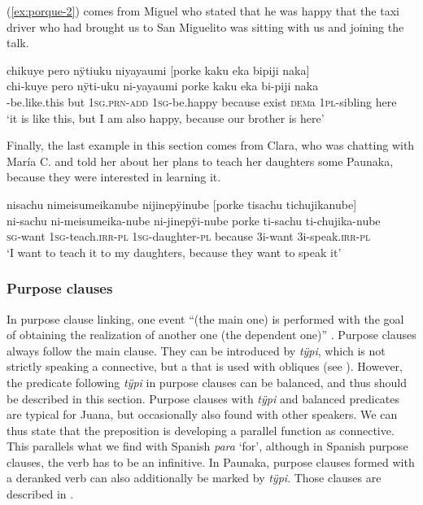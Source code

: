 (\ref{ex:porque-2}) comes from Miguel who stated that he was happy that the taxi driver who had brought us to San Miguelito was sitting with us and joining the talk.

\ea\label{ex:porque-2}
\begingl
\glpreamble chikuye pero nÿtiuku niyayaumi \textup{[}porke kaku eka bipiji naka\textup{]}\\
\gla chi-kuye pero nÿti-uku ni-yayaumi porke kaku eka bi-piji naka\\
-be.like.this but 1\textsc{sg.prn}-\textsc{add} 1\textsc{sg}-be.happy because exist \textsc{dem}a 1\textsc{pl}-sibling here\\
\glft ‘it is like this, but I am also happy, because our brother is here’
\endgl
\trailingcitation{[mty-p110906l.208-209]}
\xe


Finally, the last example in this section comes from Clara, who was chatting with María C. and told her about her plans to teach her daughters some Paunaka, because they were interested in learning it.

\ea\label{ex:porque-3}
\begingl
\glpreamble nisachu nimeisumeikanube nijinepÿinube \textup{[}porke tisachu tichujikanube\textup{]}\\
\gla ni-sachu ni-meisumeika-nube ni-jinepÿi-nube porke ti-sachu ti-chujika-nube\\
\textsc{sg}-want 1\textsc{sg}-teach.\textsc{irr}-\textsc{pl} 1\textsc{sg}-daughter-\textsc{pl} because 3i-want 3i-speak.\textsc{irr}-\textsc{pl}\\
\glft ‘I want to teach it to my daughters, because they want to speak it’
\endgl
\trailingcitation{[cux-c120414ls-2.323-324]}
\xe
{}

\subsubsection{Purpose clauses}\label{sec:PurposeClauses}

In purpose clause linking, one event “(the main one) is performed with the goal of obtaining the realization of another one (the dependent one)” \citep[157]{Cristofaro2003}. Purpose clauses always follow the main clause. They can be introduced by \textit{tÿpi}, which is not strictly speaking a connective, but a  that is used with obliques (see ). However, the predicate following \textit{tÿpi} in purpose clauses can be balanced, and thus should be described in this section. Purpose clauses with \textit{tÿpi} and balanced predicates are typical for Juana, but occasionally also found with other speakers. We can thus state that the preposition is developing a parallel function as connective. This parallels what we find with Spanish \textit{para} ‘for’, although in Spanish purpose clauses, the verb has to be an infinitive. In Paunaka, purpose clauses formed with a deranked verb can also additionally be marked by \textit{tÿpi}. Those clauses are described in .

